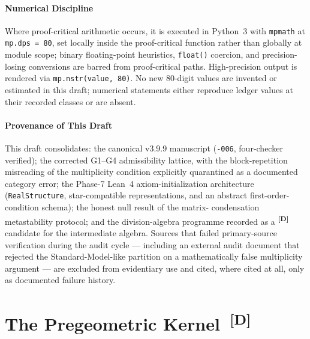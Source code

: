 \documentclass[12pt,a4paper,twoside]{article}
\theoremstyle{plain}
\theoremstyle{definition}
\theoremstyle{remark}
\newcommand{\catmark}[1]{\textsuperscript{\textsf{\textbf{[#1]}}}}
\begin{document}
\subsection{Numerical Discipline}
\label{subsec:numerical-discipline}

Where proof-critical arithmetic occurs, it is executed in Python~3 with
\texttt{mpmath} at \texttt{mp.dps = 80}, set locally inside the
proof-critical function rather than globally at module scope; binary
floating-point heuristics, \texttt{float()} coercion, and precision-losing
conversions are barred from proof-critical paths. High-precision output is
rendered via \texttt{mp.nstr(value, 80)}. No new 80-digit values are
invented or estimated in this draft; numerical statements either reproduce
ledger values at their recorded classes or are absent.

\subsection{Provenance of This Draft}
\label{subsec:provenance}

This draft consolidates: the canonical v3.9.9 manuscript
(\texttt{-006}, four-checker verified); the corrected G1--G4
admissibility lattice, with the block-repetition misreading of the
multiplicity condition explicitly quarantined as a documented category
error; the Phase-7 Lean~4 axiom-initialization architecture
(\texttt{RealStructure}, star-compatible representations, and an abstract
first-order-condition schema); the honest null result of the matrix-%
condensation metastability protocol; and the division-algebra programme
recorded as a \catmark{D} candidate for the intermediate algebra. Sources
that failed primary-source verification during the audit cycle ---
including an external audit document that rejected the
Standard-Model-like partition on a mathematically false multiplicity
argument --- are excluded from evidentiary use and cited, where cited at
all, only as documented failure history.

\newpage
\part{The Pregeometric Kernel\texorpdfstring{\ \catmark{D}}{[D]}}
\label{part:pregeometric-kernel}
\end{document}
